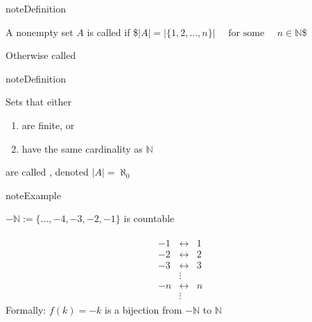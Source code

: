 \documentclass[letterpaper,10pt,english]{jupyterBook}
\begin{document}
\begin{sphinxadmonition}{note}{Definition}

\sphinxAtStartPar
A nonempty set \(A\) is called  if
\$\(
|A| = |\{1, 2, \ldots, n\}|
\quad \text{ for some } \quad
n \in \mathbb{N}
\)\$

\sphinxAtStartPar
Otherwise called 
\end{sphinxadmonition}

\begin{sphinxadmonition}{note}{Definition}

\sphinxAtStartPar
Sets that either
\begin{enumerate}
%
\item {} 
\sphinxAtStartPar
are finite, or

\item {} 
\sphinxAtStartPar
have the same cardinality as \(\mathbb{N}\)

\end{enumerate}

\sphinxAtStartPar
are called , denoted \(|A| = \aleph_0\)
\end{sphinxadmonition}

\begin{sphinxadmonition}{note}{Example}

\sphinxAtStartPar
\(-\mathbb{N} := \{\ldots, -4, -3, -2, -1\}\) is countable
\end{sphinxadmonition}
\begin{equation*}
\begin{split}
\begin{array}{ccc}
-1 & \leftrightarrow & 1 \\
-2 & \leftrightarrow & 2 \\
-3 & \leftrightarrow & 3 \\
& \vdots &  \\
-n & \leftrightarrow & n \\
& \vdots &  
\end{array}
\end{split}
\end{equation*}
\sphinxAtStartPar
Formally: \(f(k) = -k\) is a bijection from \(-\mathbb{N}\) to \(\mathbb{N}\)
\end{document}
